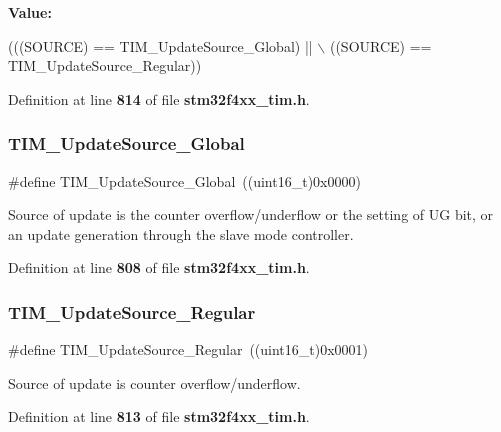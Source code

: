 {\bfseries Value\+:}
\begin{DoxyCode}
(((SOURCE) == TIM_UpdateSource_Global) || \(\backslash\)
                                      ((SOURCE) == TIM_UpdateSource_Regular))
\end{DoxyCode}


Definition at line \textbf{ 814} of file \textbf{ stm32f4xx\+\_\+tim.\+h}.

\mbox{\label{group__TIM__Update__Source_ga32c67bc3f8211a2c7b44ee9fe1523875}} 
\subsubsection{T\+I\+M\+\_\+\+Update\+Source\+\_\+\+Global}
{\footnotesize\ttfamily \#define T\+I\+M\+\_\+\+Update\+Source\+\_\+\+Global~((uint16\+\_\+t)0x0000)}

Source of update is the counter overflow/underflow or the setting of UG bit, or an update generation through the slave mode controller. 

Definition at line \textbf{ 808} of file \textbf{ stm32f4xx\+\_\+tim.\+h}.

\mbox{\label{group__TIM__Update__Source_ga6f50423cdb011137ae8cd303ccd2080c}} 
\subsubsection{T\+I\+M\+\_\+\+Update\+Source\+\_\+\+Regular}
{\footnotesize\ttfamily \#define T\+I\+M\+\_\+\+Update\+Source\+\_\+\+Regular~((uint16\+\_\+t)0x0001)}

Source of update is counter overflow/underflow. 

Definition at line \textbf{ 813} of file \textbf{ stm32f4xx\+\_\+tim.\+h}.

